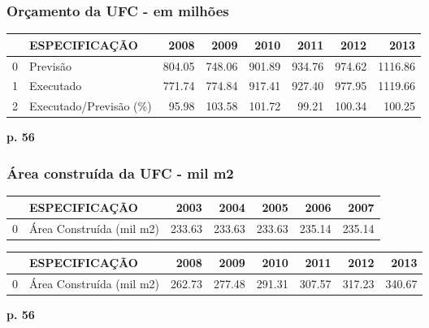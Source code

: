 \documentclass{article}
\begin{document}
\subsubsection*{Orçamento da UFC - em milhões}
\begin{tabular}{llrrrrrr}
\toprule
{} &           ESPECIFICAÇÃO &    2008 &    2009 &    2010 &    2011 &    2012 &     2013 \\
\midrule
0 &                Previsão &  804.05 &  748.06 &  901.89 &  934.76 &  974.62 &  1116.86 \\
1 &               Executado &  771.74 &  774.84 &  917.41 &  927.40 &  977.95 &  1119.66 \\
2 &  Executado/Previsão (\%) &   95.98 &  103.58 &  101.72 &   99.21 &  100.34 &   100.25 \\
\bottomrule
\end{tabular}

\textbf{p. 56}

\subsubsection*{Área construída da UFC - mil m2}
\begin{tabular}{llrrrrr}
\toprule
{} &             ESPECIFICAÇÃO &    2003 &    2004 &    2005 &    2006 &    2007 \\
\midrule
0 &  Área Construída (mil m2) &  233.63 &  233.63 &  233.63 &  235.14 &  235.14 \\
\bottomrule
\end{tabular}

\begin{tabular}{llrrrrrr}
\toprule
{} &             ESPECIFICAÇÃO &    2008 &    2009 &    2010 &    2011 &    2012 &    2013 \\
\midrule
0 &  Área Construída (mil m2) &  262.73 &  277.48 &  291.31 &  307.57 &  317.23 &  340.67 \\
\bottomrule
\end{tabular}
\textbf{p. 56}
\end{document}
